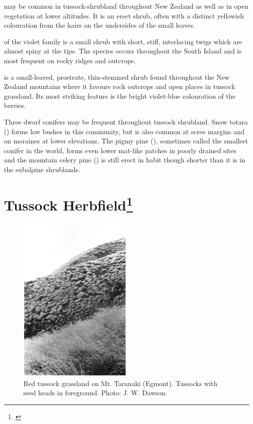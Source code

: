  may be common in tussock-shrubland throughout New Zealand as well as in open vegetation at lower altitudes.
It is an erect shrub, often with a distinct yellowish colouration from the hairs on the undersides of the small leaves.

 of the violet family is a small shrub with short, stiff, interlacing twigs which are almost spiny at the tips.
The species occurs throughout the South Island and is most frequent on rocky ridges and outcrops.

 is a small-leaved, prostrate, thin-stemmed shrub found throughout the New Zealand mountains where it favours rock outcrops and open places in tussock grassland.
Its most striking feature is the bright violet-blue colouration of the berries.

Three dwarf conifers may be frequent throughout tussock shrubland.
Snow totara () forms low bushes in this community, but is also common at scree margins and on moraines at lower elevations.
The pigmy pine (), sometimes called the smallest conifer in the world, forms even lower mat-like patches in poorly drained sites and the mountain celery pine () is still erect in habit though shorter than it is in the subalpine shrublands.

\section[Tussock Herbfield]{Tussock Herbfield\footnote{\cite{mark1980progress}}}

\begin{figure}
	\includegraphics[width=0.5\textwidth]{graphics/figure95red-tussock.jpg}
	\centering
	\caption[Red tussock grassland on Mt. Taranaki]{Red tussock grassland on Mt. Taranaki (Egmont).
    Tussocks with seed heads in foreground.
	Photo: J. W. Dawson.}
	\label{fig:95red-tussock}
\end{figure}

